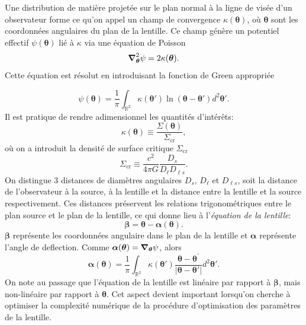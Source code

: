 \documentclass[times,10pt,twocolumn]{article}
\begin{document}
Une distribution de matière projetée sur le plan normal à la ligne de visée d'un 
observateur forme ce qu'on 
appel un champ de convergence $\kappa(\boldsymbol{\theta})$, où $\boldsymbol{\theta}$ sont 
les coordonnées angulaires du plan de la lentille. Ce champ génère un potentiel 
effectif $\psi(\boldsymbol{\theta})$ lié à $\kappa$ via une équation de Poisson
\begin{equation}\label{eq:Poisson} 
        \grad^{2}_{\boldsymbol{\theta}} \psi = 2 \kappa(\boldsymbol{\theta} ).
\end{equation} 
Cette équation est résolut en introduisant la fonction de Green appropriée

\begin{equation}\label{eq:Potentiel} 
        \psi(\boldsymbol{ \theta}) = \frac{1}{\pi} \int_{\mathbb{R}^2} 
        \kappa(\boldsymbol{ \theta}') \ln(\boldsymbol{\theta} - \boldsymbol{\theta}') d^2\boldsymbol{\theta}'.
\end{equation}
Il est pratique de rendre adimensionnel les quantités d'intérêts:
\begin{equation}\label{eq:Convergence} 
        \kappa(\boldsymbol{\theta}) \equiv \frac{\Sigma(\boldsymbol{\theta})}{\Sigma_{\mathrm{cr}}},
\end{equation} 
où on a introduit la densité de surface critique $\Sigma_{\mathrm{cr}}$
\begin{equation}\label{eq:Sigcritique} 
        \Sigma_{\mathrm{cr}} \equiv \frac{c^2}{4\pi G} \frac{D_s}{D_\ell D_{\ell s}}.
\end{equation}
On distingue 3 distances de diamètres angulaires $D_s$, $D_\ell$ et $D_{\ell s}$, 
soit la distance de l'observateur à la source, à la lentille et la distance 
entre la lentille et la source respectivement. Ces distances préservent les relations 
trigonométriques entre le plan source et le plan de la lentille, ce qui donne 
lieu à l'\textit{équation de la lentille}:
\begin{equation}\label{eq:LensEquation} 
        \boldsymbol{\beta} = \boldsymbol{\theta} - \boldsymbol{\alpha}(\boldsymbol{\theta}).
\end{equation} 
$\boldsymbol{\beta}$ représente les coordonnées angulaire dans le plan de la lentille et 
$\boldsymbol{\alpha}$ représente l'angle de deflection. Comme 
$\boldsymbol{\alpha}(\boldsymbol{\theta}) = \grad_{\boldsymbol{\theta}} \psi$, alors
\begin{equation}\label{eq:DeflectionAngle} 
        \boldsymbol{\alpha}(\boldsymbol{\theta}) = \frac{1}{\pi} \int_{\mathbb{R}^{2}} \kappa(\boldsymbol{\theta}')
        \frac{\boldsymbol{\theta} - \boldsymbol{\theta}^{'}}{|\boldsymbol{\theta} - \boldsymbol{\theta}'|}
        d^{2}\boldsymbol{\theta}'.
\end{equation} 
On note 
au passage que l'équation de la lentille est linéaire par rapport à $\boldsymbol{\beta}$, 
mais non-linéaire par rapport à $\boldsymbol{\theta}$. Cet aspect devient important lorsqu'on 
cherche à optimiser la complexité numérique de la procédure d'optimisation des paramètres de la 
lentille. \par
\end{document}
